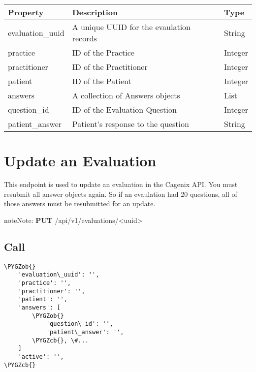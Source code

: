 \documentclass[letterpaper,10pt,english]{sphinxmanual}
\def\PYGZob{\char`\{}
\def\PYGZcb{\char`\}}
\begin{document}
\begin{tabulary}{\linewidth}{|L|L|L|}
\hline
\textsf{\relax 
Property
} & \textsf{\relax 
Description
} & \textsf{\relax 
Type
}\\
\hline
evaluation\_uuid
 & 
A unique UUID for the evaulation
records
 & 
String
\\

practice
 & 
ID of the Practice
 & 
Integer
\\

practitioner
 & 
ID of the Practitioner
 & 
Integer
\\

patient
 & 
ID of the Patient
 & 
Integer
\\

answers
 & 
A collection of Answers objects
 & 
List
\\

question\_id
 & 
ID of the Evaluation Question
 & 
Integer
\\

patient\_answer
 & 
Patient's response to the question
 & 
String
\\
\hline\end{tabulary}



\section{Update an Evaluation}
\label{dev-api-evaluations:update-an-evaluation}
This endpoint is used to update an evaluation in the Cagenix API. You must
resubmit all answer objects again.  So if an evaulation had 20 questions, all of
those answers must be resubmitted for an update.

\begin{notice}{note}{Note:}
\textbf{PUT} /api/v1/evaluations/\textless{}uuid\textgreater{}
\end{notice}


\subsection{Call}
\label{dev-api-evaluations:id2}
\begin{Verbatim}[commandchars=\\\{\}]
\PYGZob{}
    'evaluation\_uuid': '',
    'practice': '',
    'practitioner': '',
    'patient': '',
    'answers': [
        \PYGZob{}
            'question\_id': '',
            'patient\_answer': '',
        \PYGZcb{}, \#...
    ]
    'active': '',
\PYGZcb{}
\end{Verbatim}
\end{document}
